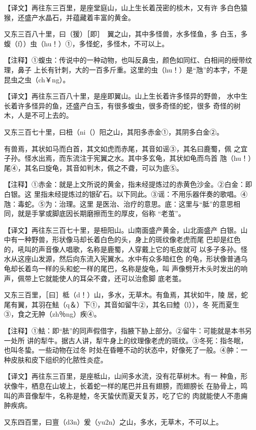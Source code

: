 \documentclass[a4paper,12pt,UTF8,twoside]{ctexbook}
\begin{document}
【译文】再往东三百里，是座堂庭山，山上生长着茂密的棪木，又有许 多白色猿猴，还盛产水晶石，并蕴藏着丰富的黄金。

又东三百八十里，曰（猨）［即］　翼之山，其中多怪兽，水多怪鱼，多 白玉，多蝮（f））虫（hu！）①，多怪蛇，多怪木，不可以上。

【注释】①蝮虫：传说中的一种动物，也叫反鼻虫，颜色如同红、白相间的绶带纹理，鼻子 上长有针刺，大的一百多斤重。这里的虫（hu！）是“虺”的本字，不是昆虫之虫（ch￥ng）。

【译文】再往东三百八十里，是座即翼山。山上生长着许多怪异的野兽， 水中生长着许多怪异的鱼，还盛产白玉，有很多蝮虫，很多奇怪的蛇，很多 奇怪的树木，人是不可上去的。

又东三百七十里，曰杻（ni（）阳之山，其阳多赤金①，其阴多白金②。

有兽焉，其状如马而白首，其文如虎而赤尾，其音如谣③，其名曰鹿蜀，佩 之宜子孙。怪水出焉，而东流注于宪翼之水。其中多玄龟，其状如龟而鸟首 虺（hu！）尾④，其名曰旋龟，其音如判木，佩之不聋，可以为底⑤。

【注释】①赤金：就是上文所说的黄金，指未经提炼过的赤黄色沙金。②白金：即白银。这 里指未经提炼过的银矿石。以下同此。③谣：不用乐器伴奏的歌唱。④虺：毒蛇。⑤为：治理。这里 是医治、治疗的意思。底：这里与“胝”的意思相同，就是手掌或脚底因长期磨擦而生的厚皮，俗称 “老茧”。

【译文】再往东三百七十里，是杻阳山。山南面盛产黄金，山北面盛产 白银。山中有一种野兽，形状像马却长着白色的头，身上的斑纹像老虎而尾 巴却是红色的，吼叫的声音像人唱歌，名称是鹿蜀，人穿戴上它的毛皮就可 以多子多孙。怪水从这座山发源，然后向东流入宪翼水。水中有众多暗红色 的龟，形状像普通乌龟却长着鸟一样的头和蛇一样的尾巴，名称是旋龟，叫 声像劈开木头时发出的响声，佩带上它就能使人的耳朵不聋，还可以治愈脚 底老茧。

又东三百里，［曰］柢（d！）山，多水，无草木。有鱼焉，其状如牛，陵 居，蛇尾有翼，其羽在魼（q＆）下①，其音如留牛②，其名曰鯥（l）），冬 死而夏生③，食之无肿（zh％ng）疾④。

【注释】①魼：即“胠”的同声假借字，指腋下胁上部分。②留牛：可能就是本书另一处所 讲的犁牛。据古人讲，犁牛身上的纹理像老虎的斑纹。③冬死：指冬眠，也叫冬蛰。一些动物在过冬 时处在昏睡不动的状态中，好像死了一般。④肿：一种皮肤和皮下组织的化脓性炎症。

【译文】再往东三百里，是座柢山，山间多水流，没有花草树木。有一 种鱼，形状像牛，栖息在山坡上，长着蛇一样的尾巴并且有翅膀，而翅膀长 在胁骨上，鸣叫的声音像犁牛，名称是鯥，冬天蛰伏而夏天复苏，吃了它的 肉就能使人不患痈肿疾病。

又东四百里，曰亶（d3n）爰（yu2n）之山，多水，无草木，不可以上。
\end{document}
